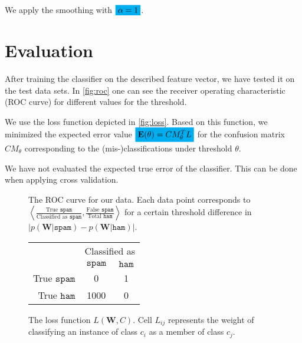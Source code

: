 \documentclass[a4paper,11pt]{article}
\newcommand{\cs}{\ensuremath{\mathtt{spam}}}
\newcommand{\ch}{\ensuremath{\mathtt{ham}}}
\newcommand{\mhl}[1]{\mathchoice%
  {\colorbox{cyan}{$\displaystyle#1$}}%
  {\colorbox{cyan}{$\textstyle#1$}}%
  {\colorbox{cyan}{$\scriptstyle#1$}}%
  {\colorbox{cyan}{$\scriptscriptstyle#1$}}}
\begin{document}
We apply the smoothing with $\mhl{\alpha = 1}$.

\section{Evaluation}
After training the classifier on the described feature vector, we have tested it on the test data sets.  In \autoref{fig:roc} one can see the receiver operating characteristic (ROC curve) for different values for the threshold. 

We use the loss function depicted in \autoref{fig:loss}.  Based on this function, we minimized the expected error value $\mhl{\mathbf{E}(\theta) = CM_\theta^T L}$ for the confusion matrix $CM_\theta$ corresponding to the (mis-)classifications under threshold $\theta$.

We have not evaluated the expected true error of the classifier.  This can be done when applying cross validation.

\begin{figure}
  \caption{The ROC curve for our data. Each data point corresponds to $\left\langle \frac{\mbox{True } \cs}{\mbox{Classified as } \cs}, \frac{\mbox{False }\cs}{\mbox{Total }\ch}\right\rangle$ for a certain threshold difference in $\left|p(\mathbf{W} | \cs) - p(\mathbf{W} | \ch)\right|$.}
  \label{fig:roc}
\end{figure}

\begin{figure}
  \caption{The loss function $L(\mathbf{W}, C)$. Cell $L_{ij}$ represents the weight of classifying an instance of class $c_i$ as a member of class $c_j$.}
  \begin{center}
    \begin{tabular}{r|cc|}
      & \multicolumn{2}{|c|}{Classified as} \\
      & $\cs$ & $\ch$ \\
      \hline
      True $\cs$ & 0 & 1 \\
      True $\ch$ & 1000 & 0 \\
      \hline
    \end{tabular}
  \end{center}
\end{figure}
\end{document}
